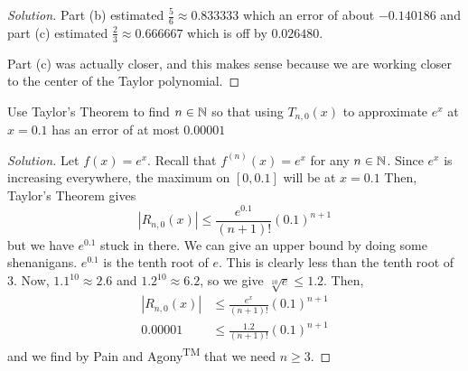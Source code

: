\documentclass{agony}
\begin{document}
\begin{enumerate}[(a)]
\begin{proof}[Solution]
          Part (b) estimated $\frac56 \approx 0.833333$ which an error of about $-0.140186$
          and part (c) estimated $\frac23 \approx 0.666667$ which is off by $0.026480$.

          Part (c) was actually closer, and this makes sense because we are working closer
          to the center of the Taylor polynomial.
        \end{proof}
\end{enumerate}


\question Use Taylor's Theorem to find $n\in\mathbb{N}$ so that using $T_{n,0}(x)$
to approximate $e^x$ at $x=0.1$ has an error of at most $0.00001$
\begin{proof}[Solution]
  Let $f(x) = e^x$. Recall that $f^{(n)}(x) = e^x$ for any $n \in \mathbb{N}$.
  Since $e^x$ is increasing everywhere, the maximum on $[0,0.1]$ will be at $x=0.1$
  Then, Taylor's Theorem gives
  \[ |R_{n,0}(x)| \leq \frac{e^{0.1}}{(n+1)!}(0.1)^{n+1} \]
  but we have $e^{0.1}$ stuck in there.
  We can give an upper bound by doing some shenanigans.
  $e^0.1$ is the tenth root of $e$.
  This is clearly less than the tenth root of 3.
  Now, $1.1^{10} \approx 2.6$ and $1.2^{10} \approx 6.2$, so we give $\sqrt[10]{e} \leq 1.2$. Then,
  \begin{align*}
    |R_{n,0}(x)| & \leq \frac{e^x}{(n+1)!}(0.1)^{n+1} \\
    0.00001      & \leq \frac{1.2}{(n+1)!}(0.1)^{n+1}
  \end{align*}
  and we find by Pain and Agony\textsuperscript{TM} that we need $n \geq 3$.
\end{proof}
\end{document}
